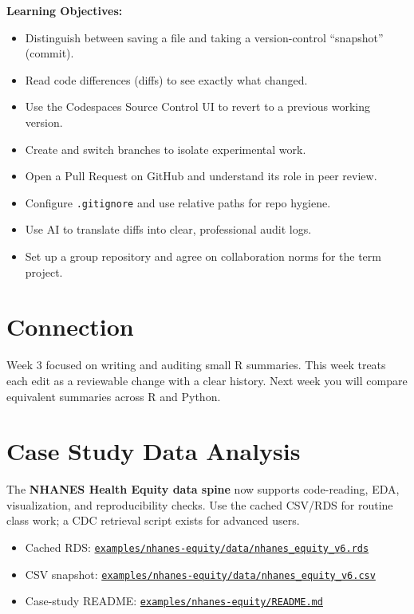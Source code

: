 \documentclass[
  letterpaper,
  DIV=11,
  numbers=noendperiod,
  oneside]{scrreprt}
\providecommand{\tightlist}{%
  \setlength{\itemsep}{0pt}\setlength{\parskip}{0pt}}
\begin{document}
\textbf{Learning Objectives:}

\begin{itemize}
\tightlist
\item
  Distinguish between saving a file and taking a version-control
  ``snapshot'' (commit).
\item
  Read code differences (diffs) to see exactly what changed.
\item
  Use the Codespaces Source Control UI to revert to a previous working
  version.
\item
  Create and switch branches to isolate experimental work.
\item
  Open a Pull Request on GitHub and understand its role in peer review.
\item
  Configure \texttt{.gitignore} and use relative paths for repo hygiene.
\item
  Use AI to translate diffs into clear, professional audit logs.
\item
  Set up a group repository and agree on collaboration norms for the
  term project.
\end{itemize}

\section*{Connection}\label{connection-3}


Week 3 focused on writing and auditing small R summaries. This week
treats each edit as a reviewable change with a clear history. Next week
you will compare equivalent summaries across R and Python.

\section*{Case Study Data Analysis}\label{case-study-data-analysis-1}


The \textbf{NHANES Health Equity data spine} now supports code-reading,
EDA, visualization, and reproducibility checks. Use the cached CSV/RDS
for routine class work; a CDC retrieval script exists for advanced
users.

\begin{itemize}
\tightlist
\item
  Cached RDS:
  \href{https://github.com/ehsanx/HDSx/blob/main/examples/nhanes-equity/data/nhanes_equity_v6.rds}{\texttt{examples/nhanes-equity/data/nhanes\_equity\_v6.rds}}
\item
  CSV snapshot:
  \href{https://github.com/ehsanx/HDSx/blob/main/examples/nhanes-equity/data/nhanes_equity_v6.csv}{\texttt{examples/nhanes-equity/data/nhanes\_equity\_v6.csv}}
\item
  Case-study README:
  \href{https://github.com/ehsanx/HDSx/blob/main/examples/nhanes-equity/README.md}{\texttt{examples/nhanes-equity/README.md}}
\end{itemize}
\end{document}
